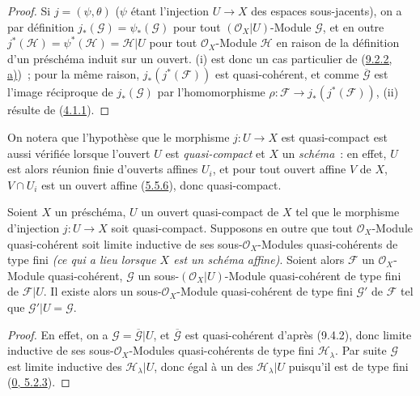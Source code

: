 \begin{proof}
Si $j=(\psi,\theta)$ ($\psi$ étant l'injection $U\to X$ des espaces
sous-jacents), on a par définition $j_*(\mathscr{G})=\psi_*(\mathscr{G})$
pour tout $(\mathscr{O}_X|U)$-Module $\mathscr{G}$, et en outre
$j^*(\mathscr{H})=\psi^*(\mathscr{H})=\mathscr{H}|U$ pour tout
$\mathscr{O}_X$-Module $\mathscr{H}$ en raison de la définition d'un
préschéma induit sur un ouvert. (i) est donc un cas particulier de
(\hyperref[I.9.2.2-fr]{9.2.2, a)})~; pour la même raison,
$j_*(j^*(\mathscr{F}))$ est quasi-cohérent, et comme
$\overline{\mathscr{G}}$ est l'image réciproque de $j_*(\mathscr{G})$ par
l'homomorphisme $\rho:\mathscr{F}\to j_*(j^*(\mathscr{F}))$, (ii) résulte de
(\hyperref[I.4.1.1-fr]{4.1.1}).
\end{proof}

On notera que l'hypothèse que le morphisme $j:U\to X$ est quasi-compact est
aussi vérifiée lorsque l'ouvert $U$ est \emph{quasi-compact} et $X$ un
\emph{schéma}~: en effet, $U$ est alors réunion finie d'ouverts affines
$U_i$, et pour tout ouvert affine $V$ de $X$, $V\cap U_i$ est un ouvert
affine (\hyperref[I.5.5.6-fr]{5.5.6}), donc quasi-compact.

\begin{corollary}[9.4.3]
\label{I.9.4.3-fr}
Soient $X$ un préschéma, $U$ un ouvert quasi-compact de $X$ tel que le
morphisme d'injection $j:U\to X$ soit quasi-compact. Supposons en outre que
tout $\mathscr{O}_X$-Module quasi-cohérent soit limite inductive de ses
sous-$\mathscr{O}_X$-Modules quasi-cohérents de type fini
\emph{(ce qui a lieu lorsque $X$ est un \emph{schéma affine})}. Soient alors
$\mathscr{F}$ un $\mathscr{O}_X$-Module quasi-cohérent, $\mathscr{G}$ un
sous-$(\mathscr{O}_X|U)$-Module quasi-cohérent de type fini de
$\mathscr{F}|U$. Il existe alors un sous-$\mathscr{O}_X$-Module
quasi-cohérent de type fini $\mathscr{G}'$ de $\mathscr{F}$ tel que
$\mathscr{G}'|U=\mathscr{G}$.
\end{corollary}

\begin{proof}
En effet, on a $\mathscr{G}=\overline{\mathscr{G}}|U$, et
$\overline{\mathscr{G}}$ est quasi-cohérent d'après (9.4.2), donc limite
inductive de ses sous-$\mathscr{O}_X$-Modules quasi-cohérents de type fini
$\mathscr{H}_\lambda$. Par suite $\mathscr{G}$ est limite inductive des
$\mathscr{H}_\lambda|U$, donc égal à un des $\mathscr{H}_\lambda|U$
puisqu'il est de type fini (\hyperref[0.5.2.3-fr]{0, 5.2.3}).
\end{proof}

